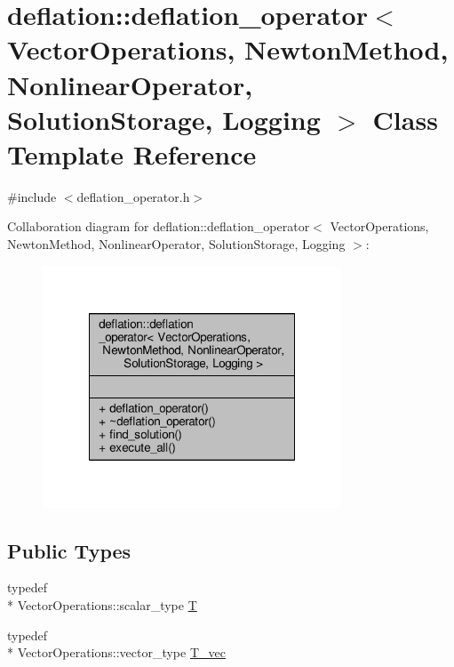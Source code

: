 \hypertarget{classdeflation_1_1deflation__operator}{\section{deflation\-:\-:deflation\-\_\-operator$<$ Vector\-Operations, Newton\-Method, Nonlinear\-Operator, Solution\-Storage, Logging $>$ Class Template Reference}
\label{classdeflation_1_1deflation__operator}
}


{\ttfamily \#include $<$deflation\-\_\-operator.\-h$>$}



Collaboration diagram for deflation\-:\-:deflation\-\_\-operator$<$ Vector\-Operations, Newton\-Method, Nonlinear\-Operator, Solution\-Storage, Logging $>$\-:
\nopagebreak
\begin{figure}[H]
\begin{center}
\leavevmode
\includegraphics[width=252pt]{classdeflation_1_1deflation__operator__coll__graph}
\end{center}
\end{figure}
\subsection*{Public Types}
\begin{DoxyCompactItemize}
\item 
typedef \\*
Vector\-Operations\-::scalar\-\_\-type \hyperlink{classdeflation_1_1deflation__operator_a16b4c1329afeb50d9477f1094df943b9}{T}
\item 
typedef \\*
Vector\-Operations\-::vector\-\_\-type \hyperlink{classdeflation_1_1deflation__operator_ac7800761f41ffb590968f434afd25985}{T\-\_\-vec}
\end{DoxyCompactItemize}
